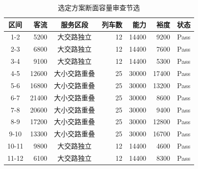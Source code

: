 \begin{table}[H]
\centering
\caption{选定方案断面容量审查节选}
\label{tab:rail-capacity-audit}
\small
\begin{tabular}{crcrrrc}
\toprule
区间 & 客流 & 服务区段 & 列车数 & 能力 & 裕度 & 状态 \\
\midrule
1-2 & 5200 & 大交路独立 & 12 & 14400 & 9200 & Pass \\
2-3 & 6800 & 大交路独立 & 12 & 14400 & 7600 & Pass \\
3-4 & 9100 & 大交路独立 & 12 & 14400 & 5300 & Pass \\
4-5 & 12600 & 大小交路重叠 & 25 & 30000 & 17400 & Pass \\
5-6 & 16800 & 大小交路重叠 & 25 & 30000 & 13200 & Pass \\
6-7 & 21400 & 大小交路重叠 & 25 & 30000 & 8600 & Pass \\
7-8 & 20600 & 大小交路重叠 & 25 & 30000 & 9400 & Pass \\
8-9 & 17200 & 大小交路重叠 & 25 & 30000 & 12800 & Pass \\
9-10 & 13300 & 大小交路重叠 & 25 & 30000 & 16700 & Pass \\
10-11 & 9800 & 大交路独立 & 12 & 14400 & 4600 & Pass \\
11-12 & 6100 & 大交路独立 & 12 & 14400 & 8300 & Pass \\
\bottomrule
\end{tabular}
\end{table}
